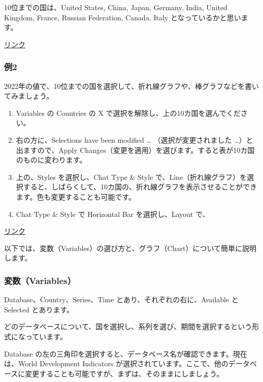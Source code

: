 \documentclass[
  xelatex, ja=standard]{bxjsbook}
\providecommand{\tightlist}{%
  \setlength{\itemsep}{0pt}\setlength{\parskip}{0pt}}
\theoremstyle{definition}
\theoremstyle{definition}
\theoremstyle{definition}
\theoremstyle{definition}
\theoremstyle{remark}
\begin{document}
10位までの国は、United States, China, Japan, Germany, India, United Kingdom, France, Russian Federation, Canada, Italy となっているかと思います。

\href{https://databank.worldbank.org/data/embed/GDP-top-10-in-2022/id/c7fdca3c}{リンク}

\hypertarget{ux4f8b2}{%
\subsubsection{例2}\label{ux4f8b2}}

2022年の値で、10位までの国を選択して、折れ線グラフや、棒グラフなどを書いてみましょう。

\begin{enumerate}
\def\labelenumi{\arabic{enumi}.}
\tightlist
\item
  Variables の Countries の X で選択を解除し、上の10カ国を選んでください。
\item
  右の方に、Selections have been modified \ldots{} （選択が変更されました \ldots）と出ますので、Apply Changes（変更を適用）を選びます。すると表が10カ国のものに変わります。
\item
  上の、Styles を選択し、Chat Type \& Style で、Line（折れ線グラフ）を選択すると、しばらくして、10カ国の、折れ線グラフを表示させることができます。色も変更することも可能です。
\item
  Chat Type \& Style で Horizontal Bar を選択し、Layout で、
\end{enumerate}

\href{https://databank.worldbank.org/Line-graph-of-GDP-of-top-10-countries/id/ff8c5a74}{リンク}

以下では、変数（Variables）の選び方と、グラフ（Chart）について簡単に説明します。

\hypertarget{ux5909ux6570variables}{%
\subsubsection{変数（Variables）}\label{ux5909ux6570variables}}

Database、Country、Series、Time とあり、それぞれの右に、Available と Selected とあります。

どのデータベースについて、国を選択し、系列を選び、期間を選択するという形式になっています。

Database の左の三角印を選択すると、データベース名が確認できます。現在は、World Development Indicators が選択されています。ここで、他のデータベースに変更することも可能ですが、まずは、そのままにしましょう。
\end{document}
